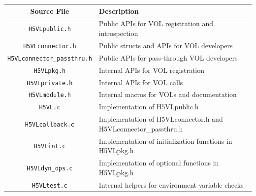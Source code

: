 \begin{table}[!ht]
\begin{tabular}{||c|l||}
\hline
\textbf{Source File} & \textbf{Description} \\  [0.5ex] 
\hline\hline
\texttt{H5VLpublic.h} & Public APIs for VOL registration and introspection \\
\texttt{H5VLconnector.h} & Public structs and APIs for VOL developers \\
\texttt{H5VLconnector\_passthru.h} & Public APIs for pass-through VOL developers \\
\texttt{H5VLpkg.h} & Internal APIs for VOL registration \\
\texttt{H5VLprivate.h} & Internal APIs for VOL calls \\
\texttt{H5VLmodule.h} & Internal macros for VOLs and documentation \\
\texttt{H5VL.c} & Implementation of H5VLpublic.h \\
\texttt{H5VLcallback.c} & Implementation of H5VLconnector.h and H5VLconnector\_passthru.h \\
\texttt{H5VLint.c} & Implementation of initialization functions in H5VLpkg.h \\
\texttt{H5VLdyn\_ops.c} & Implementation of optional functions in H5VLpkg.h \\
\texttt{H5VLtest.c} & Internal helpers for environment variable checks \\
\hline
\end{tabular}
\label{table:VOL_src_files}
\end{table}



